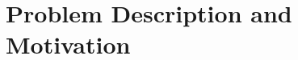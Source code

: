 \documentclass[manuscript, screen]{acmart}
\begin{document}



\section{Problem Description and Motivation}
\end{document}
